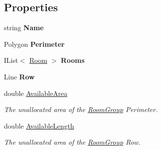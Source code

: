 \subsection*{Properties}
\begin{DoxyCompactItemize}
\item 
\mbox{\label{class_room_kit_1_1_room_group_a417fd126a5e34d449608c1631def5bda}} 
string {\bfseries Name}
\item 
\mbox{\label{class_room_kit_1_1_room_group_a8dbb76a89711abe54d050b5b9241a723}} 
Polygon {\bfseries Perimeter}
\item 
\mbox{\label{class_room_kit_1_1_room_group_a7143373fa233225c88cb3bca95dfed52}} 
I\+List$<$ \mbox{\hyperlink{class_room_kit_1_1_room}{Room}} $>$ {\bfseries Rooms}
\item 
\mbox{\label{class_room_kit_1_1_room_group_afbd07e259d1e3938ab84c1e99a5456d9}} 
Line {\bfseries Row}
\item 
double \mbox{\hyperlink{class_room_kit_1_1_room_group_ab3bb576979e3e0c610b2afcb4d7744b3}{Available\+Area}}
\begin{DoxyCompactList}\small\item\em The unallocated area of the \mbox{\hyperlink{class_room_kit_1_1_room_group}{Room\+Group}} Perimeter. \end{DoxyCompactList}\item 
double \mbox{\hyperlink{class_room_kit_1_1_room_group_ac1598a6191029a361787fe7d01bd2c94}{Available\+Length}}
\begin{DoxyCompactList}\small\item\em The unallocated area of the \mbox{\hyperlink{class_room_kit_1_1_room_group}{Room\+Group}} Row. \end{DoxyCompactList}\item 

\end{DoxyCompactItemize}
